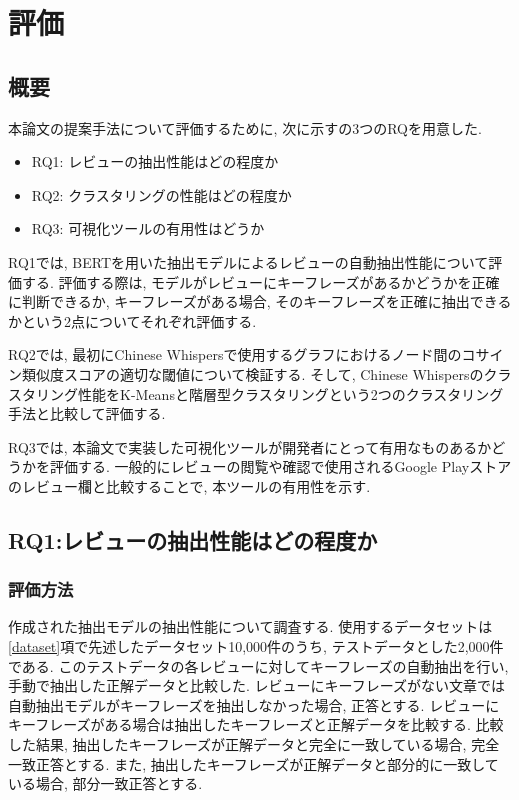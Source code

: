 \chapter{評価}
\label{chap:kekkahyouka}

\section{概要}
本論文の提案手法について評価するために, 次に示すの3つのRQを用意した. 

\begin{itemize}
  \item RQ1: レビューの抽出性能はどの程度か
  \item RQ2: クラスタリングの性能はどの程度か
  \item RQ3: 可視化ツールの有用性はどうか
\end{itemize}

RQ1では, BERTを用いた抽出モデルによるレビューの自動抽出性能について評価する. 評価する際は, モデルがレビューにキーフレーズがあるかどうかを正確に判断できるか, キーフレーズがある場合, そのキーフレーズを正確に抽出できるかという2点についてそれぞれ評価する. 

RQ2では, 最初にChinese Whispersで使用するグラフにおけるノード間のコサイン類似度スコアの適切な閾値について検証する. そして, Chinese Whispersのクラスタリング性能をK-Meansと階層型クラスタリングという2つのクラスタリング手法と比較して評価する. 

RQ3では, 本論文で実装した可視化ツールが開発者にとって有用なものあるかどうかを評価する. 一般的にレビューの閲覧や確認で使用されるGoogle Playストアのレビュー欄と比較することで, 本ツールの有用性を示す. 

\section{RQ1:レビューの抽出性能はどの程度か}
\subsection{評価方法}\label{method}
作成された抽出モデルの抽出性能について調査する. 使用するデータセットは\ref{dataset}項で先述したデータセット10,000件のうち, テストデータとした2,000件である. このテストデータの各レビューに対してキーフレーズの自動抽出を行い, 手動で抽出した正解データと比較した. 
レビューにキーフレーズがない文章では自動抽出モデルがキーフレーズを抽出しなかった場合, 正答とする. レビューにキーフレーズがある場合は抽出したキーフレーズと正解データを比較する. 
比較した結果, 抽出したキーフレーズが正解データと完全に一致している場合, 完全一致正答とする. また, 抽出したキーフレーズが正解データと部分的に一致している場合, 部分一致正答とする. 

